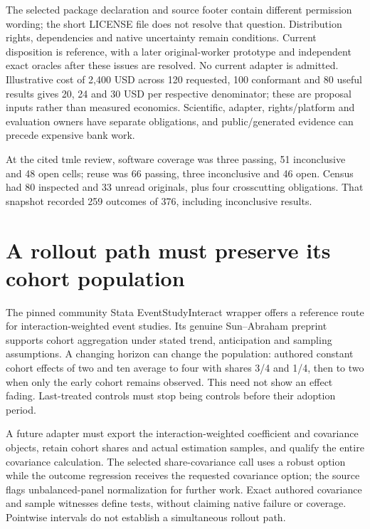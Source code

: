 The selected package declaration and source footer contain different
permission wording; the short LICENSE file does not resolve that
question. Distribution rights, dependencies and native uncertainty
remain conditions. Current disposition is reference, with a later
original-worker prototype and independent exact oracles after these
issues are resolved. No current adapter is admitted. Illustrative cost
of 2,400 USD across 120 requested, 100 conformant and 80 useful results
gives 20, 24 and 30 USD per respective denominator; these are proposal
inputs rather than measured economics. Scientific, adapter,
rights/platform and evaluation owners have separate obligations, and
public/generated evidence can precede expensive bank work.
\citep{exec24_tmle_sources,exec24_tmle_contract}

At the cited tmle review, software coverage was three passing, 51
inconclusive and 48 open cells; reuse was 66 passing, three inconclusive
and 46 open. Census had 80 inspected and 33 unread originals, plus four
crosscutting obligations. That snapshot recorded 259 outcomes of 376,
including inconclusive results.
\citep{sp24tmle_reader,sp24tmle_progress}

\hypertarget{a-rollout-path-must-preserve-its-cohort-population}{%
\section{A rollout path must preserve its cohort
population}\label{a-rollout-path-must-preserve-its-cohort-population}}

The pinned community Stata EventStudyInteract wrapper offers a reference
route for interaction-weighted event studies. Its genuine Sun--Abraham
preprint supports cohort aggregation under stated trend, anticipation
and sampling assumptions. A changing horizon can change the population:
authored constant cohort effects of two and ten average to four with
shares 3/4 and 1/4, then to two when only the early cohort remains
observed. This need not show an effect fading. Last-treated controls
must stop being controls before their adoption period.
\citep{exec24_eventstudy_sources,exec24_eventstudy_original,exec24_eventstudy_contract}

A future adapter must export the interaction-weighted coefficient and
covariance objects, retain cohort shares and actual estimation samples,
and qualify the entire covariance calculation. The selected
share-covariance call uses a robust option while the outcome regression
receives the requested covariance option; the source flags
unbalanced-panel normalization for further work. Exact authored
covariance and sample witnesses define tests, without claiming native
failure or coverage. Pointwise intervals do not establish a simultaneous
rollout path.
\citep{exec24_eventstudy_sources,exec24_eventstudy_contract}

